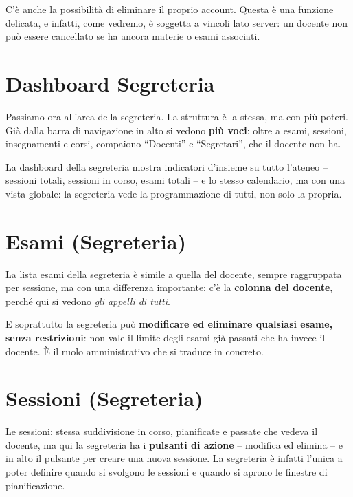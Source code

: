\documentclass[11pt]{article}
\begin{document}
C'è anche la possibilità di eliminare il proprio account. Questa è una funzione delicata,
e infatti, come vedremo, è soggetta a vincoli lato server: un docente non può essere
cancellato se ha ancora materie o esami associati.

\section*{Dashboard Segreteria}

Passiamo ora all'area della segreteria. La struttura è la stessa, ma con più poteri.
Già dalla barra di navigazione in alto si vedono \textbf{più voci}: oltre a esami,
sessioni, insegnamenti e corsi, compaiono ``Docenti'' e ``Segretari'', che il docente
non ha.

La dashboard della segreteria mostra indicatori d'insieme su tutto l'ateneo -- sessioni
totali, sessioni in corso, esami totali -- e lo stesso calendario, ma con una vista
globale: la segreteria vede la programmazione di tutti, non solo la propria.

\section*{Esami (Segreteria)}

La lista esami della segreteria è simile a quella del docente, sempre raggruppata per
sessione, ma con una differenza importante: c'è la \textbf{colonna del docente}, perché
qui si vedono \emph{gli appelli di tutti}.

E soprattutto la segreteria può \textbf{modificare ed eliminare qualsiasi esame, senza
restrizioni}: non vale il limite degli esami già passati che ha invece il docente. È il
ruolo amministrativo che si traduce in concreto.

\section*{Sessioni (Segreteria)}

Le sessioni: stessa suddivisione in corso, pianificate e passate che vedeva il docente,
ma qui la segreteria ha i \textbf{pulsanti di azione} -- modifica ed elimina -- e in alto
il pulsante per creare una nuova sessione. La segreteria è infatti l'unica a poter
definire quando si svolgono le sessioni e quando si aprono le finestre di pianificazione.
\end{document}

